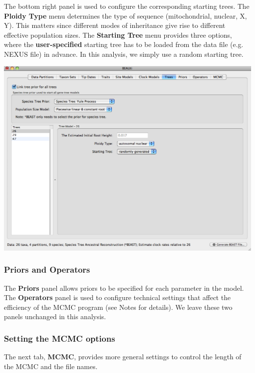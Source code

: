 \documentclass[12pt]{article}
\begin{document}
The bottom right panel is used to configure the corresponding starting trees. The \textbf{Ploidy Type} menu determines the type of sequence (mitochondrial, nuclear, X, Y). This matters since different modes of inheritance give rise to different effective population sizes. The \textbf{Starting Tree} menu provides three options, where the \textbf{user-specified} starting tree has to be loaded from the data file (e.g. NEXUS file) in advance. In this analysis, we simply use a random starting tree. 

\medskip{}

\includegraphics[scale=0.4]{figures/BEAUti_Tree}

\medskip{}

\subsubsection*{Priors and Operators}

The {\bf Priors} panel allows priors to be specified for each parameter in the model. The {\bf Operators} panel is used to configure technical settings that affect the efficiency of the MCMC program (see Notes for details). We leave these two panels unchanged in this analysis.

\subsubsection*{Setting the MCMC options }

The next tab, {\bf MCMC}, provides more general
settings to control the length of the MCMC and the file names. 
\end{document}
